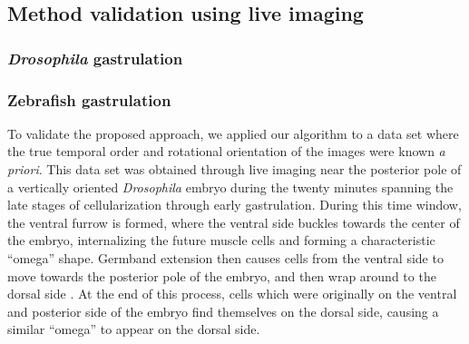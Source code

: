 \documentclass[twocolumn, 10pt]{article}
\makeatletter
\newcommand{\customlabel}[2]{%
\protected@write \@auxout {}{\string \newlabel {#1}{{#2}{}}}}
\makeatother
\begin{document}


\subsection*{Method validation using live imaging}

\subsubsection*{{\em Drosophila} gastrulation}

\subsubsection*{Zebrafish gastrulation}


To validate the proposed approach, we applied our algorithm to a data set where the true temporal order and rotational orientation of the images were known {\em a priori}.
%
This data set was obtained through live imaging near the posterior pole of a vertically oriented {\it Drosophila} embryo during the twenty minutes spanning the late stages of cellularization through early gastrulation.
%
During this time window, the ventral furrow is formed, where the ventral side buckles towards the center of the embryo, internalizing the future muscle cells and forming a characteristic ``omega'' shape.
%
Germband extension then causes cells from the ventral side to move towards the posterior pole of the embryo, and then wrap around to the dorsal side \citep{leptin2005gastrulation}.
%
At the end of this process, cells which were originally on the ventral and posterior side of the embryo find themselves on the dorsal side, causing a similar ``omega'' to appear on the dorsal side.
\end{document}

